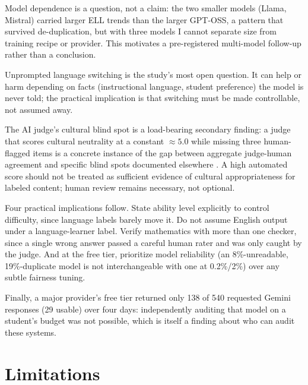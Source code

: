 \documentclass[runningheads]{llncs}
\begin{document}
Model dependence is a question, not a claim: the two smaller models (Llama, Mistral) carried larger ELL trends than the larger GPT-OSS, a pattern that survived de-duplication, but with three models I cannot separate size from training recipe or provider. This motivates a pre-registered multi-model follow-up rather than a conclusion.

Unprompted language switching is the study's most open question. It can help or harm depending on facts (instructional language, student preference) the model is never told; the practical implication is that switching must be made controllable, not assumed away.

The AI judge's cultural blind spot is a load-bearing secondary finding: a judge that scores cultural neutrality at a constant $\approx 5.0$ while missing three human-flagged items is a concrete instance of the gap between aggregate judge-human agreement and specific blind spots documented elsewhere \cite{zheng2023,gallegos2024}. A high automated score should not be treated as sufficient evidence of cultural appropriateness for labeled content; human review remains necessary, not optional.

Four practical implications follow. State ability level explicitly to control difficulty, since language labels barely move it. Do not assume English output under a language-learner label. Verify mathematics with more than one checker, since a single wrong answer passed a careful human rater and was only caught by the judge. And at the free tier, prioritize model reliability (an 8\%-unreadable, 19\%-duplicate model is not interchangeable with one at 0.2\%/2\%) over any subtle fairness tuning.

Finally, a major provider's free tier returned only 138 of 540 requested Gemini responses (29 usable) over four days: independently auditing that model on a student's budget was not possible, which is itself a finding about who can audit these systems.

\section{Limitations}
\end{document}
